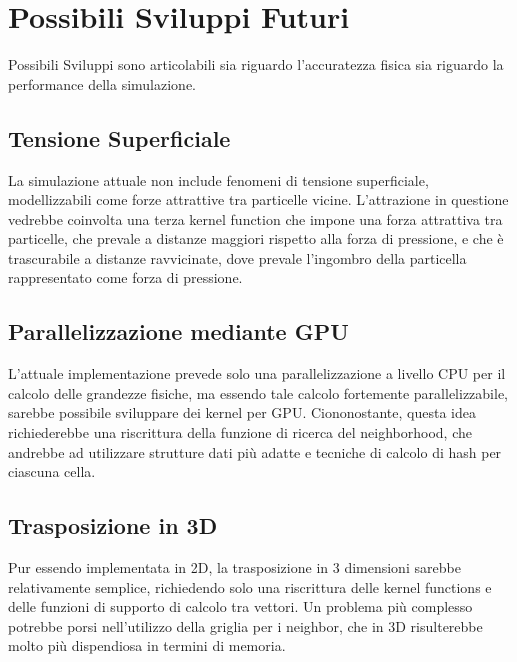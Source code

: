 \section{Possibili Sviluppi Futuri}
    Possibili Sviluppi sono articolabili sia riguardo l'accuratezza fisica sia riguardo la 
    performance della simulazione.

    \subsection{Tensione Superficiale}
        La simulazione attuale non include fenomeni di tensione superficiale, 
        modellizzabili come forze attrattive tra particelle vicine. L'attrazione in questione 
        vedrebbe coinvolta una terza kernel function che impone una forza attrattiva tra particelle,
        che prevale a distanze maggiori rispetto alla forza di pressione, e che è trascurabile a 
        distanze ravvicinate, dove prevale l'ingombro della particella rappresentato come forza di 
        pressione.

    \subsection{Parallelizzazione mediante GPU}
        L'attuale implementazione prevede solo una parallelizzazione a livello CPU per il calcolo
        delle grandezze fisiche, ma essendo tale calcolo fortemente parallelizzabile, sarebbe possibile 
        sviluppare dei kernel per GPU. Ciononostante, questa idea richiederebbe una riscrittura della
        funzione di ricerca del neighborhood, che andrebbe ad utilizzare strutture dati 
        più adatte e tecniche di calcolo di hash per ciascuna cella.

    \subsection{Trasposizione in 3D}
        Pur essendo implementata in 2D, la trasposizione in 3 dimensioni sarebbe relativamente
        semplice, richiedendo solo una riscrittura delle kernel functions e delle funzioni 
        di supporto di calcolo tra vettori. Un problema più complesso potrebbe porsi nell'utilizzo
        della griglia per i neighbor, che in 3D risulterebbe molto più dispendiosa in termini di memoria.